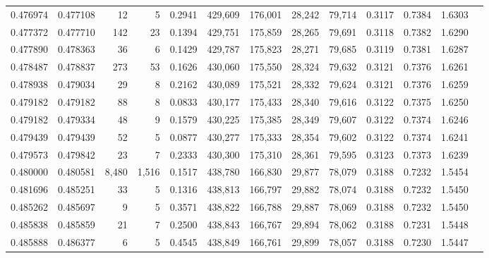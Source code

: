 \begin{tabular}{rrrrrrrrrrrrr}
0.476974 & 0.477108 &     12 &     5 &                                     0.2941 & 429,609 & 176,001 &  28,242 &  79,714 & 0.3117 & 0.7384 & 1.6303 \\
0.477372 & 0.477710 &    142 &    23 &                                     0.1394 & 429,751 & 175,859 &  28,265 &  79,691 & 0.3118 & 0.7382 & 1.6290 \\
0.477890 & 0.478363 &     36 &     6 &                                     0.1429 & 429,787 & 175,823 &  28,271 &  79,685 & 0.3119 & 0.7381 & 1.6287 \\
0.478487 & 0.478837 &    273 &    53 &                                     0.1626 & 430,060 & 175,550 &  28,324 &  79,632 & 0.3121 & 0.7376 & 1.6261 \\
0.478938 & 0.479034 &     29 &     8 &                                     0.2162 & 430,089 & 175,521 &  28,332 &  79,624 & 0.3121 & 0.7376 & 1.6259 \\
0.479182 & 0.479182 &     88 &     8 &                                     0.0833 & 430,177 & 175,433 &  28,340 &  79,616 & 0.3122 & 0.7375 & 1.6250 \\
0.479182 & 0.479334 &     48 &     9 &                                     0.1579 & 430,225 & 175,385 &  28,349 &  79,607 & 0.3122 & 0.7374 & 1.6246 \\
0.479439 & 0.479439 &     52 &     5 &                                     0.0877 & 430,277 & 175,333 &  28,354 &  79,602 & 0.3122 & 0.7374 & 1.6241 \\
0.479573 & 0.479842 &     23 &     7 &                                     0.2333 & 430,300 & 175,310 &  28,361 &  79,595 & 0.3123 & 0.7373 & 1.6239 \\
0.480000 & 0.480581 &  8,480 & 1,516 &                                     0.1517 & 438,780 & 166,830 &  29,877 &  78,079 & 0.3188 & 0.7232 & 1.5454 \\
0.481696 & 0.485251 &     33 &     5 &                                     0.1316 & 438,813 & 166,797 &  29,882 &  78,074 & 0.3188 & 0.7232 & 1.5450 \\
0.485262 & 0.485697 &      9 &     5 &                                     0.3571 & 438,822 & 166,788 &  29,887 &  78,069 & 0.3188 & 0.7232 & 1.5450 \\
0.485838 & 0.485859 &     21 &     7 &                                     0.2500 & 438,843 & 166,767 &  29,894 &  78,062 & 0.3188 & 0.7231 & 1.5448 \\
0.485888 & 0.486377 &      6 &     5 &                                     0.4545 & 438,849 & 166,761 &  29,899 &  78,057 & 0.3188 & 0.7230 & 1.5447 \\

\end{tabular}
